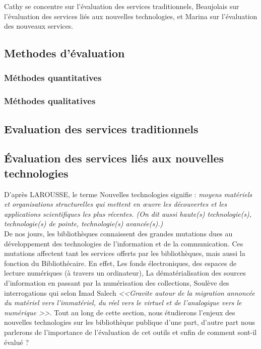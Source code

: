 \documentclass[french,a4paper,12pt]{article}
\begin{document}
Cathy se concentre sur l’évaluation des services traditionnels, Beaujolais sur l’évaluation des services liés aux nouvelles technologies, et Marina sur l’évaluation des nouveaux services.
\subsection{Methodes d'évaluation}

\subsubsection{Méthodes quantitatives}


\subsubsection{Méthodes qualitatives}


\subsection{Evaluation des services traditionnels}




\subsection{Évaluation des services liés aux nouvelles technologies}
\quad D'après LAROUSSE, le terme Nouvelles technologies signifie :\textit{ moyens matériels et organisations structurelles qui mettent en œuvre les découvertes et les applications scientifiques les plus récentes. (On dit aussi haute(s) technologie(s), technologie(s) de pointe, technologie(s) avancée(s).)}\\

\quad De nos jours, les bibliothèques connaissent des grandes mutations dues au développement des technologies de l'information et de la communication. Ces mutations affectent tant les services offerts par les bibliothèques, mais aussi la fonction du Bibliothécaire. En effet, Les fonds électroniques, des espaces de lecture numériques (à travers un ordinateur), La dématérialisation des sources d'information en passant par la numérisation des collections, Soulève des interrogations qui selon Imad Salech \textit{<<Gravite autour de la migration annoncée du matériel vers l'immatériel, du réel vers le virtuel et de l'analogique vers le numérique >>}\citep{saleh_bibliotheques_2009}. Tout au long de cette section, nous étudierons l’enjeux  des nouvelles technologies  sur les bibliothèque publique d’une part, d’autre part nous parlerons de l’importance de l’évaluation de cet outils  et enfin de comment sont-il évalué ?
\end{document}
